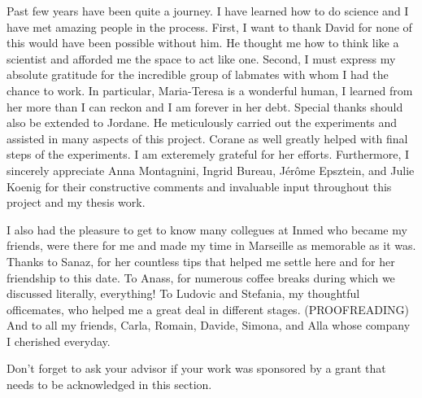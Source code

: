 Past few years have been quite a journey.
I have learned how to do science and I have met amazing people in the process.
First, I want to thank David for none of this would have been possible without him.
He thought me how to think like a scientist and afforded me the space to act like one.
Second, I must express my absolute gratitude for the incredible group of labmates with whom I had the chance to work.
In particular, Maria-Teresa is a wonderful human, I learned from her more than I can reckon and I am forever in her debt.
Special thanks should also be extended to Jordane.
He meticulously carried out the experiments and assisted in many aspects of this project.
Corane as well greatly helped with final steps of the experiments.
I am exteremely grateful for her efforts.
Furthermore, I sincerely appreciate Anna Montagnini, Ingrid Bureau, J\'{e}r\^{o}me Epsztein, and Julie Koenig for their constructive comments and invaluable input throughout this project and my thesis work.
\par
I also had the pleasure to get to know many collegues at Inmed who became my friends, were there for me and made my time in Marseille as memorable as it was.
Thanks to Sanaz, for her countless tips that helped me settle here and for her friendship to this date.
To Anass, for numerous coffee breaks during which we discussed literally, everything!
To Ludovic and Stefania, my thoughtful officemates, who helped me a great deal in different stages. (PROOFREADING)
And to all my friends, Carla, Romain, Davide, Simona, and Alla whose company I cherished everyday.






Don't forget to ask your advisor if your work was sponsored by a grant that needs to be acknowledged in this section.  